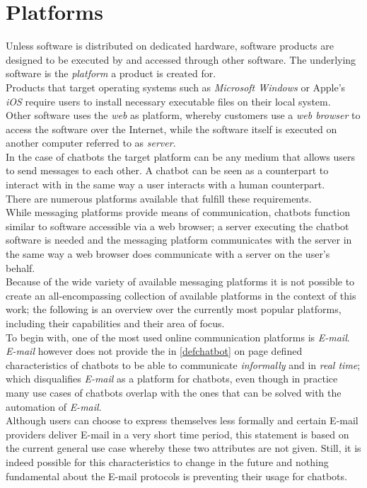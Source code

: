 \section{Platforms}
\label{platforms}


Unless software is distributed on dedicated hardware, software products are designed to be executed by and accessed through other software.
The underlying software is the \emph{platform} a product is created for.
\\
Products that target operating systems such as \emph{Microsoft Windows} or Apple's \emph{iOS} require users to install necessary executable files on their local system.
\\
Other software uses the \emph{web} as platform, whereby customers use a \emph{web browser} to access the software over the Internet,
while the software itself is executed on another computer referred to as \emph{server}.
\\

In the case of chatbots the target platform can be any medium that allows users to send messages to each other.
A chatbot can be seen as a counterpart to interact with in the same way a user interacts with a human counterpart.
\\

There are numerous platforms available that fulfill these requirements.
\\

While messaging platforms provide means of communication, chatbots function similar to software accessible via a web browser;
a server executing the chatbot software is needed and the messaging platform communicates with the server in the same way a web browser does communicate with a server on the user's behalf.
\\

Because of the wide variety of available messaging platforms it is not possible to create an all-encompassing collection of available platforms in the context of this work;
the following is an overview over the currently most popular platforms, including their capabilities and their area of focus.
\\

To begin with, one of the most used online communication platforms is \emph{E-mail}.
\\
\emph{E-mail} however does not provide the in \ref{defchatbot} on page \pageref{defchatbot} defined characteristics of chatbots to be able to communicate \emph{informally} and in \emph{real time};
which disqualifies \emph{E-mail} as a platform for chatbots, even though in practice many use cases of chatbots overlap with the ones that can be solved with the automation of \emph{E-mail}.
\\
Although users can choose to express themselves less formally and certain E-mail providers deliver E-mail in a very short time period,
this statement is based on the current general use case whereby these two attributes are not given.
Still, it is indeed possible for this characteristics to change in the future
and nothing fundamental about the E-mail protocols is preventing their usage for chatbots.
\\


